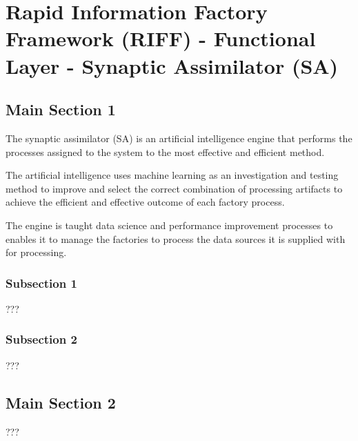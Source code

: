 
\chapter{Rapid Information Factory Framework (RIFF) - Functional Layer - Synaptic Assimilator (SA)} %

\label{Chapter07} %



\section{Main Section 1}

The synaptic assimilator (SA) is an artificial intelligence \cite{o2013artificial} engine that performs the processes assigned to the system to the most effective and efficient method.

The artificial intelligence uses machine learning as an investigation and testing method to improve and select the correct combination of processing artifacts to achieve the efficient and effective outcome of each factory process.

The engine is taught data science and performance improvement processes to enables it to manage the factories to process the data sources it is supplied with for processing.

\subsection{Subsection 1}

???


\subsection{Subsection 2}

???


\section{Main Section 2}

???
